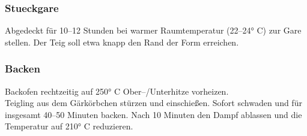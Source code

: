     \subsubsection*{\Gls{Stueckgare}} 
    Abgedeckt für 10–12 Stunden bei warmer Raumtemperatur (22–24° C) zur Gare stellen. Der Teig soll etwa knapp den Rand der Form erreichen.
    \subsubsection*{\Gls{Backen}}
    Backofen rechtzeitig auf 250° C Ober–/Unterhitze vorheizen.\\
    Teigling aus dem Gärkörbchen stürzen und einschießen. Sofort schwaden und für insgesamt 40–50
    Minuten backen. Nach 10 Minuten den Dampf ablassen und die Temperatur auf 210° C reduzieren.
    

















 
 
 

 









